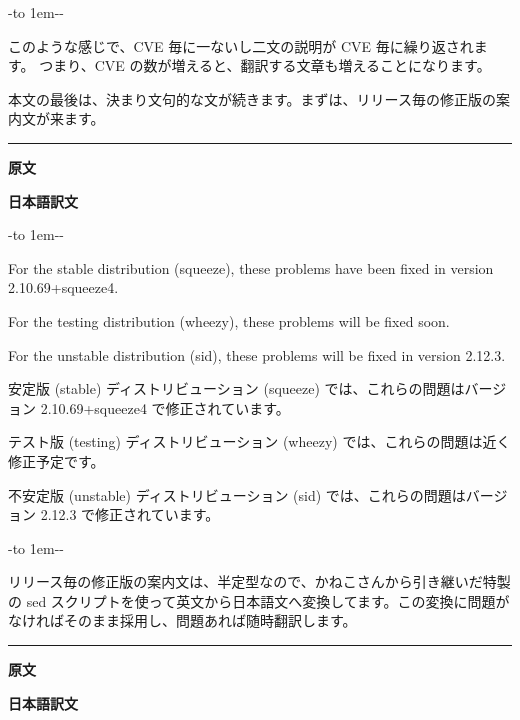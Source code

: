 \documentclass[mingoth,a4paper]{jsarticle}
\begin{document}
-\leaders\hbox to 1em{\hss{}-\hss}\hfill -\par

\vspace{1em}\par

このような感じで、CVE 毎に一ないし二文の説明が CVE 毎に繰り返されます。
つまり、CVE の数が増えると、翻訳する文章も増えることになります。

本文の最後は、決まり文句的な文が続きます。まずは、リリース毎の修正版の案内文が来ます。

\vspace{1ex}
\pagebreak[2]
\hrule
{}\par
\parbox[t]{0.47\linewidth}{{\bf 原文}}\hfil \parbox{0.48\linewidth}{\bf 日本語訳文}\par\vspace{0.1em}

-\leaders\hbox to 1em{\hss{}-\hss}\hfill -\par
\parbox[t]{0.47\linewidth}{
For the stable distribution (squeeze), these problems have been fixed in version 2.10.69+squeeze4.

For the testing distribution (wheezy), these problems will be fixed soon.

For the unstable distribution (sid), these problems will be fixed in version 2.12.3.
}\hfil
\parbox[t]{0.48\linewidth}{
安定版 (stable) ディストリビューション (squeeze) では、これらの問題はバージョン 2.10.69+squeeze4 で修正されています。

テスト版 (testing) ディストリビューション (wheezy) では、これらの問題は近く修正予定です。

不安定版 (unstable) ディストリビューション (sid) では、これらの問題はバージョン 2.12.3 で修正されています。
}\hfil

-\leaders\hbox to 1em{\hss{}-\hss}\hfill -\par

\vspace{1ex}\par

リリース毎の修正版の案内文は、半定型なので、かねこさんから引き継いだ特製の sed スクリプトを使って英文から日本語文へ変換してます。この変換に問題がなければそのまま採用し、問題あれば随時翻訳します。

\vspace{1ex}
\pagebreak[2]

\hrule
{}\par
\parbox[t]{0.47\linewidth}{{\bf 原文}}\hfil \parbox{0.48\linewidth}{\bf 日本語訳文}\par\vspace{0.1em}
\end{document}
